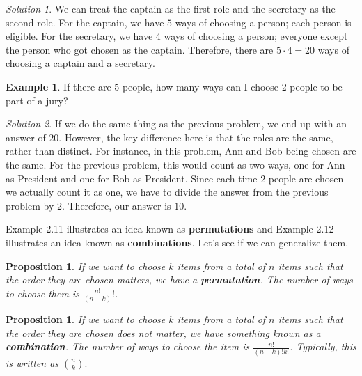 \documentclass[l1pt]{article}
\theoremstyle{plain}
\newtheorem{prop}[thm]{Proposition}
\theoremstyle{definition}
\newtheorem{example}[thm]{Example}
\theoremstyle{remark}
\newtheorem*{solution}{Solution}
\begin{document}
\begin{solution}
We can treat the captain as the first role and the secretary as the second role. For the captain, we have $5$ ways of choosing a person; each person is eligible. For the secretary, we have $4$ ways of choosing a person; everyone except the person who got chosen as the captain. Therefore, there are $5\cdot 4=20 $ ways of choosing a captain and a secretary.
\end{solution}


\begin{example}
If there are $5$ people, how many ways can I choose $2$ people to be part of a jury?
\end{example}

\begin{solution}
If we do the same thing as the previous problem, we end up with an answer of $20$. However, the key difference here is that the roles are the same, rather than distinct. For instance, in this problem, Ann and Bob being chosen are the same. For the previous problem, this would count as two ways, one for Ann as President and one for Bob as President. Since each time $2$ people are chosen we actually count it as one, we have to divide the answer from the previous problem by $2$. Therefore, our answer is $10$.
\end{solution}

Example 2.11 illustrates an idea known as \textbf{permutations} and Example 2.12 illustrates an idea known as \textbf{combinations}. Let's see if we can generalize them.

\bigskip


\begin{mdframed}
\begin{prop}
If we want to choose $k$ items from a total of $n$ items such that the order they are chosen matters, we have a \textbf{permutation}. The number of ways to choose them is $\frac{n!}{(n-k)}!$.
\end{prop}
\end{mdframed}

\begin{mdframed}
\begin{prop}
If we want to choose $k$ items from a total of $n$ items such that the order they are chosen does not matter, we have something known as a \textbf{combination}. The number of ways to choose the item is $\frac{n!}{(n-k)!k!}$. Typically, this is written as $\binom{n}{k}.$
\end{prop}
\end{mdframed}
\end{document}
